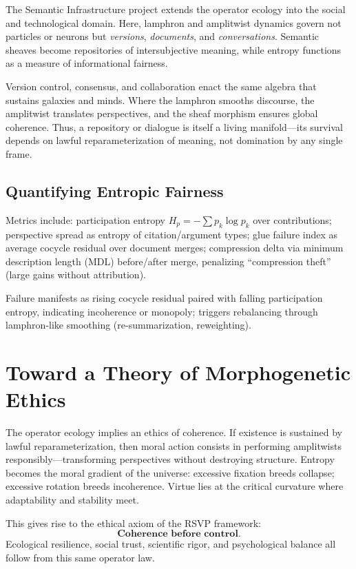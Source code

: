 \documentclass[12pt]{article}
\begin{document}
The Semantic Infrastructure project extends the operator ecology into the social and technological domain.
Here, lamphron and amplitwist dynamics govern not particles or neurons but \emph{versions}, \emph{documents}, and \emph{conversations}.
Semantic sheaves become repositories of intersubjective meaning, while entropy functions as a measure of informational fairness.

Version control, consensus, and collaboration enact the same algebra that sustains galaxies and minds.
Where the lamphron smooths discourse, the amplitwist translates perspectives, and the sheaf morphism ensures global coherence.
Thus, a repository or dialogue is itself a living manifold---its survival depends on lawful reparameterization of meaning, not domination by any single frame.

\subsection{Quantifying Entropic Fairness}

Metrics include: participation entropy $H_p = -\sum p_k \log p_k$ over contributions; perspective spread as entropy of citation/argument types; glue failure index as average cocycle residual over document merges; compression delta via minimum description length (MDL) before/after merge, penalizing “compression theft” (large gains without attribution).

Failure manifests as rising cocycle residual paired with falling participation entropy, indicating incoherence or monopoly; triggers rebalancing through lamphron-like smoothing (re-summarization, reweighting).

\section{Toward a Theory of Morphogenetic Ethics}

The operator ecology implies an ethics of coherence.
If existence is sustained by lawful reparameterization, then moral action consists in performing amplitwists responsibly---transforming perspectives without destroying structure.
Entropy becomes the moral gradient of the universe: excessive fixation breeds collapse; excessive rotation breeds incoherence.
Virtue lies at the critical curvature where adaptability and stability meet.

This gives rise to the ethical axiom of the RSVP framework:
\[
\textbf{Coherence before control.}
\]
Ecological resilience, social trust, scientific rigor, and psychological balance all follow from this same operator law.
\end{document}
